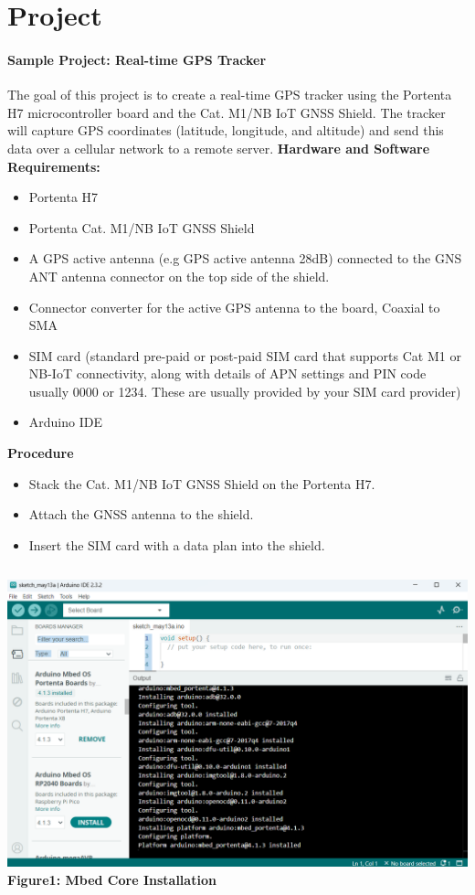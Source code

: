 \section{Project}
{ 
	\framesubtitle{Sample Project: Real-time GPS Tracker}
	The goal of this project is to create a real-time GPS tracker using the Portenta H7 microcontroller board and the Cat. M1/NB IoT GNSS Shield. The tracker will capture GPS coordinates (latitude, longitude, and altitude) and send this data over a cellular network to a remote server.
\textbf{Hardware and Software Requirements:}
\begin{itemize}
	\item Portenta H7
	\item Portenta Cat. M1/NB IoT GNSS Shield
	\item A GPS active antenna (e.g GPS active antenna 28dB) connected to the GNS ANT antenna connector on the top side of the shield.
	\item Connector converter for the active GPS antenna to the board, Coaxial to SMA
	\item SIM card (standard pre-paid or post-paid SIM card that supports
	Cat M1 or NB-IoT connectivity, along with details of APN settings
	and PIN code usually 0000 or 1234. These are usually provided by
	your SIM card provider)
	\item Arduino IDE
\end{itemize} 

\textbf{Procedure}
\begin{itemize}
	\item Stack the Cat. M1/NB IoT GNSS Shield on the Portenta H7.
	\item Attach the GNSS antenna to the shield.
	\item Insert the SIM card with a data plan into the shield.	
\end{itemize} 

	\begin{columns}
		\centering
		\includegraphics[width=\textwidth]{images/CoreInstallation.png}
		\vspace{0.2cm}
		\textbf{Figure1: Mbed Core Installation} 
		\label{Core}
		

\end{columns}}

